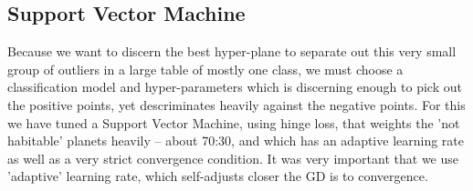 \documentclass[11.5pt]{article}
\begin{document}
\subsection{Support Vector Machine}
Because we want to discern the best hyper-plane to separate out this very small group of outliers in a large table of mostly one class, we must choose a classification model and hyper-parameters which is discerning enough to pick out the positive points, yet descriminates heavily against the negative points. For this we have tuned a Support Vector Machine, using hinge loss, that weights the 'not habitable' planets heavily -- about 70:30, and which has an adaptive learning rate as well as a very strict convergence condition.  It was very important that we use 'adaptive' learning rate, which self-adjusts closer the GD is to convergence. 
\end{document}
